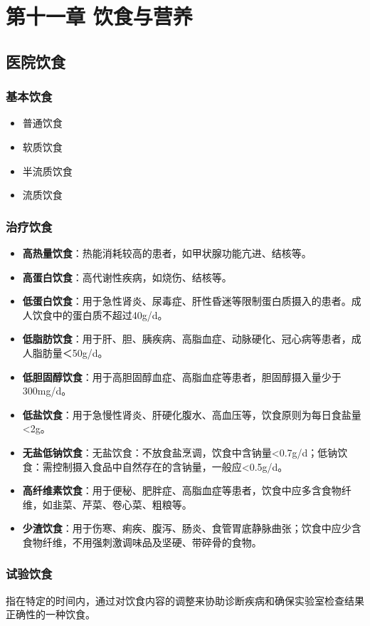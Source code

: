 \documentclass[11pt, a4paper]{ctexart}
\begin{document}
\section{第十一章 饮食与营养}
\subsection{医院饮食}
\subsubsection{基本饮食}
\begin{itemize}
    \item 普通饮食
    \item 软质饮食
    \item 半流质饮食
    \item 流质饮食
\end{itemize}

\subsubsection{治疗饮食}
\begin{itemize}
    \item \textbf{高热量饮食}：热能消耗较高的患者，如甲状腺功能亢进、结核等。
    \item \textbf{高蛋白饮食}：高代谢性疾病，如烧伤、结核等。
    \item \textbf{低蛋白饮食}：用于急性肾炎、尿毒症、肝性昏迷等限制蛋白质摄入的患者。成人饮食中的蛋白质不超过40g/d。
    \item \textbf{低脂肪饮食}：用于肝、胆、胰疾病、高脂血症、动脉硬化、冠心病等患者，成人脂肪量＜50g/d。
    \item \textbf{低胆固醇饮食}：用于高胆固醇血症、高脂血症等患者，胆固醇摄入量少于300mg/d。
    \item \textbf{低盐饮食}：用于急慢性肾炎、肝硬化腹水、高血压等，饮食原则为每日食盐量<2g。
    \item \textbf{无盐低钠饮食}：无盐饮食：不放食盐烹调，饮食中含钠量<0.7g/d；低钠饮食：需控制摄入食品中自然存在的含钠量，一般应<0.5g/d。
    \item \textbf{高纤维素饮食}：用于便秘、肥胖症、高脂血症等患者，饮食中应多含食物纤维，如韭菜、芹菜、卷心菜、粗粮等。
    \item \textbf{少渣饮食}：用于伤寒、痢疾、腹泻、肠炎、食管胃底静脉曲张；饮食中应少含食物纤维，不用强刺激调味品及坚硬、带碎骨的食物。
\end{itemize}

\subsubsection{试验饮食}
指在特定的时间内，通过对饮食内容的调整来协助诊断疾病和确保实验室检查结果正确性的一种饮食。
\end{document}
